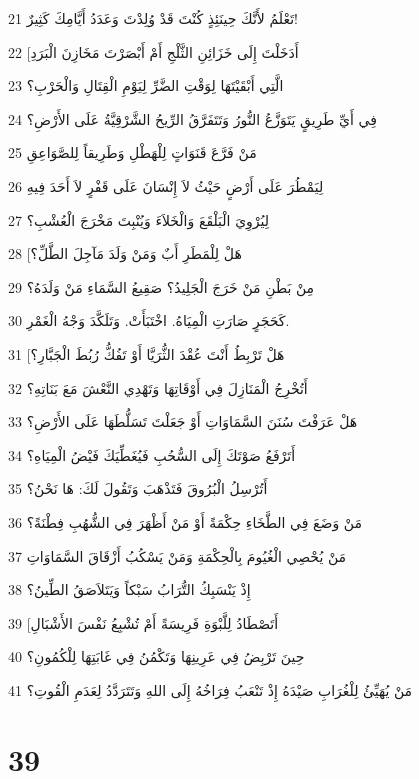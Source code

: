 \par 21 تَعْلَمُ لأَنَّكَ حِينَئِذٍ كُنْتَ قَدْ وُلِدْتَ وَعَدَدُ أَيَّامِكَ كَثِيرٌ!
\par 22 [أَدَخَلْتَ إِلَى خَزَائِنِ الثَّلْجِ أَمْ أَبْصَرْتَ مَخَازِنَ الْبَرَدِ
\par 23 الَّتِي أَبْقَيْتَهَا لِوَقْتِ الضَّرِّ لِيَوْمِ الْقِتَالِ وَالْحَرْبِ؟
\par 24 فِي أَيِّ طَرِيقٍ يَتَوَزَّعُ النُّورُ وَتَتَفَرَّقُ الرِّيحُ الشَّرْقِيَّةُ عَلَى الأَرْضِ؟
\par 25 مَنْ فَرَّعَ قَنَوَاتٍ لِلْهَطْلِ وَطَرِيقاً لِلصَّوَاعِقِ
\par 26 لِيَمْطُرَ عَلَى أَرْضٍ حَيْثُ لاَ إِنْسَانَ عَلَى قَفْرٍ لاَ أَحَدَ فِيهِ
\par 27 لِيُرْوِيَ الْبَلْقَعَ وَالْخَلاَءَ وَيُنْبِتَ مَخْرَجَ الْعُشْبِ؟
\par 28 [هَلْ لِلْمَطَرِ أَبٌ وَمَنْ وَلَدَ مَآجِلَ الطَّلِّ؟
\par 29 مِنْ بَطْنِ مَنْ خَرَجَ الْجَلِيدُ؟ صَقِيعُ السَّمَاءِ مَنْ وَلَدَهُ؟
\par 30 كَحَجَرٍ صَارَتِ الْمِيَاهُ. اخْتَبَأَتْ. وَتَلَكَّدَ وَجْهُ الْغَمْرِ.
\par 31 [هَلْ تَرْبِطُ أَنْتَ عُقْدَ الثُّرَيَّا أَوْ تَفُكُّ رُبُطَ الْجَبَّارِ؟
\par 32 أَتُخْرِجُ الْمَنَازِلَ فِي أَوْقَاتِهَا وَتَهْدِي النَّعْشَ مَعَ بَنَاتِهِ؟
\par 33 هَلْ عَرَفْتَ سُنَنَ السَّمَاوَاتِ أَوْ جَعَلْتَ تَسَلُّطَهَا عَلَى الأَرْضِ؟
\par 34 أَتَرْفَعُ صَوْتَكَ إِلَى السُّحُبِ فَيُغَطِّيَكَ فَيْضُ الْمِيَاهِ؟
\par 35 أَتُرْسِلُ الْبُرُوقَ فَتَذْهَبَ وَتَقُولَ لَكَ: هَا نَحْنُ؟
\par 36 مَنْ وَضَعَ فِي الطَّخَاءِ حِكْمَةً أَوْ مَنْ أَظْهَرَ فِي الشُّهُبِ فِطْنَةً؟
\par 37 مَنْ يُحْصِي الْغُيُومَ بِالْحِكْمَةِ وَمَنْ يَسْكُبُ أَزْقَاقَ السَّمَاوَاتِ
\par 38 إِذْ يَنْسَبِكُ التُّرَابُ سَبْكاً وَيَتَلاَصَقُ الطِّينُ؟
\par 39 [أَتَصْطَادُ لِلَّبْوَةِ فَرِيسَةً أَمْ تُشْبِعُ نَفْسَ الأَشْبَالِ
\par 40 حِينَ تَرْبِضُ فِي عَرِينِهَا وَتَكْمُنُ فِي غَابَتِهَا لِلْكُمُونِ؟
\par 41 مَنْ يُهَيِّئُ لِلْغُرَابِ صَيْدَهُ إِذْ تَنْعَبُ فِرَاخُهُ إِلَى اللهِ وَتَتَرَدَّدُ لِعَدَمِ الْقُوتِ؟

\chapter{39}

